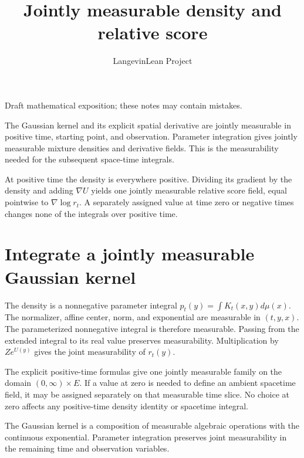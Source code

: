 \documentclass[11pt,a4paper]{article}
\title{\texorpdfstring{Jointly measurable density and relative score}{Jointly measurable density and relative score}}
\author{LangevinLean Project}
\date{}
\begin{document}
\maketitle
Draft mathematical exposition; these notes may contain mistakes.


The Gaussian kernel and its explicit spatial derivative are jointly measurable in positive time, starting point, and observation. Parameter integration gives jointly measurable mixture densities and derivative fields. This is the measurability needed for the subsequent space-time integrals.



At positive time the density is everywhere positive. Dividing its gradient by the density and adding \(\nabla U\) yields one jointly measurable relative score field, equal pointwise to \(\nabla\log r_t\). A separately assigned value at time zero or negative times changes none of the integrals over positive time.


\section{\texorpdfstring{Integrate a jointly measurable Gaussian kernel}{Integrate a jointly measurable Gaussian kernel}}


The density is a nonnegative parameter integral \(p_t(y)=\int K_t(x,y)d\mu(x)\). The normalizer, affine center, norm, and exponential are measurable in \((t,y,x)\). The parameterized nonnegative integral is therefore measurable. Passing from the extended integral to its real value preserves measurability. Multiplication by \(Z e^{U(y)}\) gives the joint measurability of \(r_t(y)\).



The explicit positive-time formulas give one jointly measurable family on the domain \((0,\infty)\times E\). If a value at zero is needed to define an ambient spacetime field, it may be assigned separately on that measurable time slice. No choice at zero affects any positive-time density identity or spacetime integral.



The Gaussian kernel is a composition of measurable algebraic operations with the continuous exponential. Parameter integration preserves joint measurability in the remaining time and observation variables.
\end{document}
